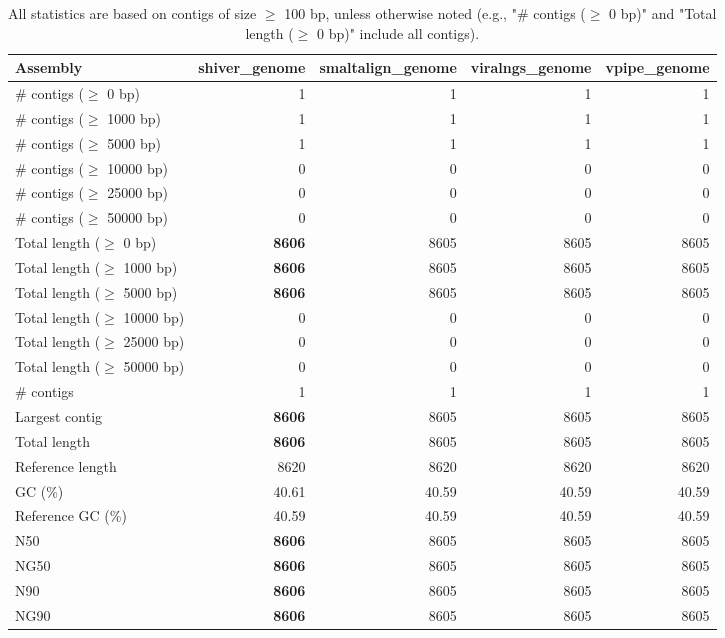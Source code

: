 \documentclass[12pt,a4paper]{article}
\begin{document}
\begin{table}[ht]
\begin{center}
\caption{All statistics are based on contigs of size $\geq$ 100 bp, unless otherwise noted (e.g., "\# contigs ($\geq$ 0 bp)" and "Total length ($\geq$ 0 bp)" include all contigs).}
\begin{tabular}{|l*{4}{|r}|}
\hline
Assembly & shiver\_genome & smaltalign\_genome & viralngs\_genome & vpipe\_genome \\ \hline
\# contigs ($\geq$ 0 bp) & 1 & 1 & 1 & 1 \\ \hline
\# contigs ($\geq$ 1000 bp) & 1 & 1 & 1 & 1 \\ \hline
\# contigs ($\geq$ 5000 bp) & 1 & 1 & 1 & 1 \\ \hline
\# contigs ($\geq$ 10000 bp) & 0 & 0 & 0 & 0 \\ \hline
\# contigs ($\geq$ 25000 bp) & 0 & 0 & 0 & 0 \\ \hline
\# contigs ($\geq$ 50000 bp) & 0 & 0 & 0 & 0 \\ \hline
Total length ($\geq$ 0 bp) & {\bf 8606} & 8605 & 8605 & 8605 \\ \hline
Total length ($\geq$ 1000 bp) & {\bf 8606} & 8605 & 8605 & 8605 \\ \hline
Total length ($\geq$ 5000 bp) & {\bf 8606} & 8605 & 8605 & 8605 \\ \hline
Total length ($\geq$ 10000 bp) & 0 & 0 & 0 & 0 \\ \hline
Total length ($\geq$ 25000 bp) & 0 & 0 & 0 & 0 \\ \hline
Total length ($\geq$ 50000 bp) & 0 & 0 & 0 & 0 \\ \hline
\# contigs & 1 & 1 & 1 & 1 \\ \hline
Largest contig & {\bf 8606} & 8605 & 8605 & 8605 \\ \hline
Total length & {\bf 8606} & 8605 & 8605 & 8605 \\ \hline
Reference length & 8620 & 8620 & 8620 & 8620 \\ \hline
GC (\%) & 40.61 & 40.59 & 40.59 & 40.59 \\ \hline
Reference GC (\%) & 40.59 & 40.59 & 40.59 & 40.59 \\ \hline
N50 & {\bf 8606} & 8605 & 8605 & 8605 \\ \hline
NG50 & {\bf 8606} & 8605 & 8605 & 8605 \\ \hline
N90 & {\bf 8606} & 8605 & 8605 & 8605 \\ \hline
NG90 & {\bf 8606} & 8605 & 8605 & 8605 \\ \hline

\end{tabular}
\end{center}
\end{table}
\end{document}
